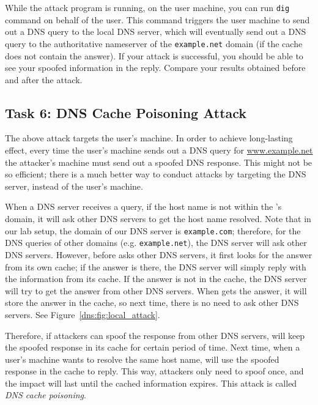While the attack program is running, on the user machine, you can
run \texttt{dig} command on behalf of the user.
This command triggers the user
machine to send out a DNS query to the local DNS server, which will
eventually send out a DNS query to the authoritative nameserver of the
\texttt{example.net} domain (if the cache does not contain the answer).
If your attack is successful, you should be able to see
your spoofed information in the reply. Compare your results obtained before
and after the attack. 




\subsection{Task 6: DNS Cache Poisoning Attack}

The above attack targets the user's machine. In order to achieve long-lasting
effect, every time the user's machine sends out a DNS query for
\url{www.example.net}
the attacker's machine must send out a spoofed DNS response. 
This might not be so efficient; there is a much better way to conduct attacks 
by targeting the DNS server, instead of the user's machine.


When a DNS server \apollo receives a query, if the host name is not within the 
\apollo's domain,
it will ask other DNS servers to get the host name resolved. Note that in
our lab setup, the domain of our DNS server is {\tt example.com}; therefore,
for the DNS queries of other domains (e.g. \texttt{example.net}), the DNS server
\apollo will ask other DNS servers.
However, before \apollo asks other DNS servers, it first looks 
for the answer from its own cache; if the answer is there, 
the DNS server \apollo will simply reply with the information from its cache. 
If the answer is not in the cache, the DNS server will 
try to get the answer from other DNS servers. When \apollo gets the 
answer, it will store the answer in the cache, so next time, 
there is no need to ask other DNS servers. See Figure~\ref{dns:fig:local_attack}. 

Therefore, if attackers can spoof the response from other DNS 
servers, \apollo will keep the spoofed response in its cache for 
certain period of time. Next time, when a user's machine wants to resolve the 
same host name, \apollo will use the spoofed response in the cache 
to reply. This way, attackers only need to spoof once, and 
the impact will last until the cached information expires. 
This attack is called {\em DNS cache poisoning}.  


